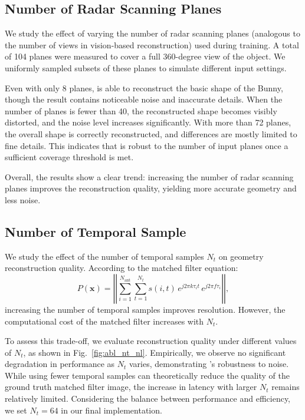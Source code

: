 \subsection{Number of Radar Scanning Planes}
We study the effect of varying the number of radar scanning planes (analogous to the number of views in vision-based reconstruction) used during training.
A total of 104 planes were measured to cover a full 360-degree view of the object.
We uniformly sampled subsets of these planes to simulate different input settings.


Even with only 8 planes, \name{} is able to reconstruct the basic shape of the Bunny, though the result contains noticeable noise and inaccurate details.
When the number of planes is fewer than 40, the reconstructed shape becomes visibly distorted, and the noise level increases significantly.
With more than 72 planes, the overall shape is correctly reconstructed, and differences are mostly limited to fine details.
This indicates that \name{} is robust to the number of input planes once a sufficient coverage threshold is met.

Overall, the results show a clear trend: increasing the number of radar scanning planes improves the reconstruction quality, yielding more accurate geometry and less noise.



\subsection{Number of Temporal Sample}
We study the effect of the number of temporal samples \( N_t \) on geometry reconstruction quality.
According to the matched filter equation:
\begin{equation*}
P(\mathbf{x}) = \left| \left| \sum_{i = 1}^{N_{\text{ant}}} \sum_{t=1}^{N_t} s(i, t) \, e^{j 2\pi k \tau_i t} \, e^{j 2\pi f \tau_i} \right| \right|,
\end{equation*}
increasing the number of temporal samples improves resolution.
However, the computational cost of the matched filter increases with \( N_t \).

To assess this trade-off, we evaluate reconstruction quality under different values of \( N_t \), as shown in Fig.~\ref{fig:abl_nt_nl}.
Empirically, we observe no significant degradation in performance as \( N_t \) varies, demonstrating \name{}'s robustness to noise.
While using fewer temporal samples can theoretically reduce the quality of the ground truth matched filter image, the increase in latency with larger \( N_t \) remains relatively limited.
Considering the balance between performance and efficiency, we set \( N_t = 64 \) in our final implementation.


